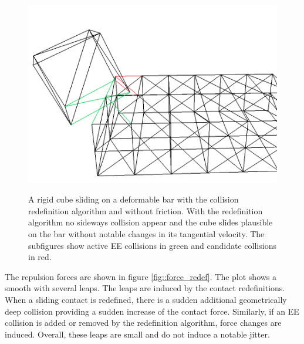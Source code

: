 \begin{figure}[tbp]
\begin{minipage}[b]{0.3 \linewidth}
{	       \includegraphics[width=1.0\linewidth]{pics/png/redef_ee06.png} }
		\end{minipage}
				\caption[A rigid cube sliding on a deformable barwith the collision redefinition algorithm and without friction.]{A rigid cube sliding on a deformable bar with the collision redefinition algorithm and without friction. With the redefinition algorithm no sideways collision appear and the cube slides plausible on the bar without notable changes in its tangential velocity. The subfigures show active EE collisions in green and candidate collisions in red.}
				\label{fig::redef_collsEE}
\end{figure}

The repulsion forces are shown in figure \ref{fig::force_redef}. The plot shows a smooth with several leaps. The leaps are induced by the contact redefinitions. When a sliding contact is redefined, there is a sudden additional geometrically deep collision providing a sudden increase of the contact force. Similarly, if an EE collision is added or removed by the redefinition algorithm, force changes are induced. Overall, these leaps are small and do not induce a notable jitter.

